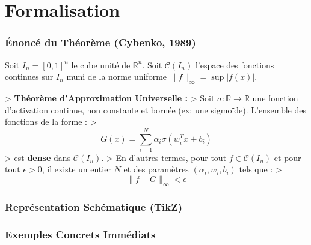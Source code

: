 \documentclass[11pt,a4paper]{article}
\begin{document}
\section{Formalisation}

\subsubsection{Énoncé du Théorème (Cybenko, 1989)}

Soit $I_n = [0, 1]^n$ le cube unité de $\mathbb{R}^n$. Soit $\mathcal{C}(I_n)$ l'espace des fonctions continues sur $I_n$ muni de la norme uniforme $\|f\|_\infty = \sup |f(x)|$.

> \textbf{Théorème d'Approximation Universelle :}
> Soit $\sigma : \mathbb{R} \to \mathbb{R}$ une fonction d'activation continue, non constante et bornée (ex: une sigmoïde). L'ensemble des fonctions de la forme :
> $$G(x) = \sum_{i=1}^N \alpha_i \sigma(w_i^T x + b_i)$$
> est \textbf{dense} dans $\mathcal{C}(I_n)$.
> En d'autres termes, pour tout $f \in \mathcal{C}(I_n)$ et pour tout $\epsilon > 0$, il existe un entier $N$ et des paramètres $(\alpha_i, w_i, b_i)$ tels que :
> $$\|f - G\|_\infty < \epsilon$$


\subsubsection{Représentation Schématique (TikZ)}




\subsubsection{Exemples Concrets Immédiats}
\end{document}
